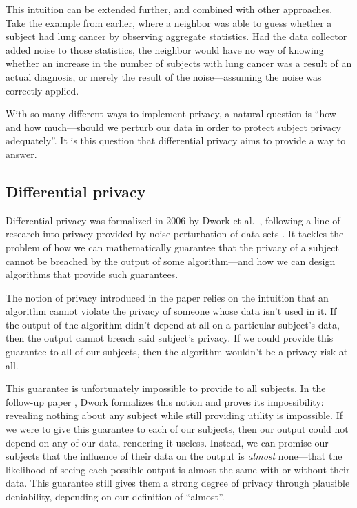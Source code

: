 \documentclass[a4paper,12pt]{article}
\begin{document}
This intuition can be extended further, and combined with other approaches. Take the example from earlier, where a neighbor was able to guess whether a subject had lung cancer by observing aggregate statistics. Had the data collector added noise to those statistics, the neighbor would have no way of knowing whether an increase in the number of subjects with lung cancer was a result of an actual diagnosis, or merely the result of the noise---assuming the noise was correctly applied. 

With so many different ways to implement privacy, a natural question is ``how---and how much---should we perturb our data in order to protect subject privacy adequately''. It is this question that differential privacy aims to provide a way to answer.

\subsection{Differential privacy \label{sec:promise}}

Differential privacy was formalized in 2006 by Dwork et al.\ \cite{dworketal2006}, following a line of research into privacy provided by noise-perturbation of data sets \cite{precursor_2003,precursor_2004,precusor_2005}. It tackles the problem of how we can mathematically guarantee that the privacy of a subject cannot be breached by the output of some algorithm---and how we can design algorithms that provide such guarantees.

The notion of privacy introduced in the paper relies on the intuition that an algorithm cannot violate the privacy of someone whose data isn't used in it. If the output of the algorithm didn't depend at all on a particular subject's data, then the output cannot breach said subject's privacy. If we could provide this guarantee to all of our subjects, then the algorithm wouldn't be a privacy risk at all.

This guarantee is unfortunately impossible to provide to all subjects. In the follow-up paper \cite{dwork2006_diffpriv}, Dwork formalizes this notion and proves its impossibility: revealing nothing about any subject while still providing utility is impossible. If we were to give this guarantee to each of our subjects, then our output could not depend on any of our data, rendering it useless. Instead, we can promise our subjects that the influence of their data on the output is \emph{almost} none---that the likelihood of seeing each possible output is almost the same with or without their data. This guarantee still gives them a strong degree of privacy through plausible deniability, depending on our definition of ``almost''.
\end{document}
